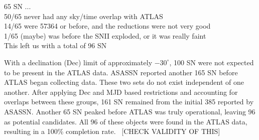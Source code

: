 \documentclass[aps,prb,twocolumn,superscriptaddress]{revtex4-1}
\begin{document}
 65 SN ...\\
 50/65 never had any sky/time overlap with ATLAS\\
 14/65 were 57364 or before, and the reductions were not very good\\
 1/65 (maybe) was before the SNII exploded, or it was really faint\\
 This left us with a total of 96 SN
\fi



\indent With a declination (Dec) limit of approximately $-30^{\circ}$, 100 SN were not 
expected to be present in the ATLAS data.
ASASSN reported another 165 SN before ATLAS began collecting data. 
These two sets do not exist independent of one another. 
After applying Dec and MJD based restrictions and accounting for overlaps between 
these groups, 161 SN remained from the initial 385 reported by ASASSN. 
Another 65 SN peaked before ATLAS was truly operational, leaving 96 as potential candidates.
All 96 of these objects were found in the ATLAS data, resulting in a 100\% completion rate.
~[CHECK VALIDITY OF THIS]
\end{document}
